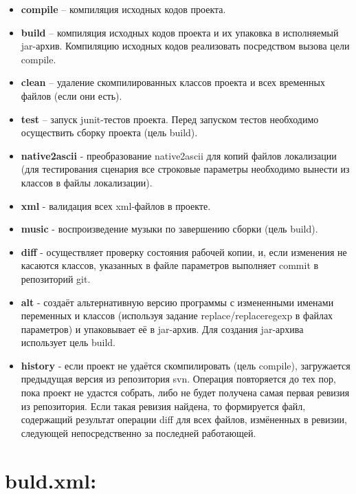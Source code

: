 \begin{itemize}
    \item \textbf{compile} -- компиляция исходных кодов проекта.
    \item \textbf{build} -- компиляция исходных кодов проекта и их упаковка в исполняемый jar-архив. Компиляцию исходных кодов реализовать
посредством вызова цели compile.
    \item \textbf{clean} -- удаление скомпилированных классов проекта и всех временных файлов (если они есть).
    \item \textbf{test} -- запуск junit-тестов проекта. Перед запуском тестов необходимо осуществить сборку проекта (цель build).
    \item \textbf{native2ascii} - преобразование native2ascii для копий файлов локализации (для тестирования сценария все строковые
    параметры необходимо вынести из классов в файлы локализации).
    \item \textbf{xml} - валидация всех xml-файлов в проекте.
    \item \textbf{music} - воспроизведение музыки по завершению сборки (цель build).
    \item \textbf{diff} - осуществляет проверку состояния рабочей копии, и, если изменения не касаются классов, указанных в файле
    параметров выполняет commit в репозиторий git.
    \item \textbf{alt} - создаёт альтернативную версию программы с измененными именами переменных и классов (используя задание
    replace/replaceregexp в файлах параметров) и упаковывает её в jar-архив. Для создания jar-архива использует цель build.
    \item \textbf{history} - если проект не удаётся скомпилировать (цель compile), загружается предыдущая версия из репозитория
    svn. Операция повторяется до тех пор, пока проект не удастся собрать, либо не будет получена самая первая ревизия из репозитория.
    Если такая ревизия найдена, то формируется файл, содержащий результат операции diff для всех файлов, измёненных в ревизии,
    следующей непосредственно за последней работающей.
\end{itemize}


\newpage
\thispagestyle{empty}
\BgThispage
\section{buld.xml:}
\tiny

